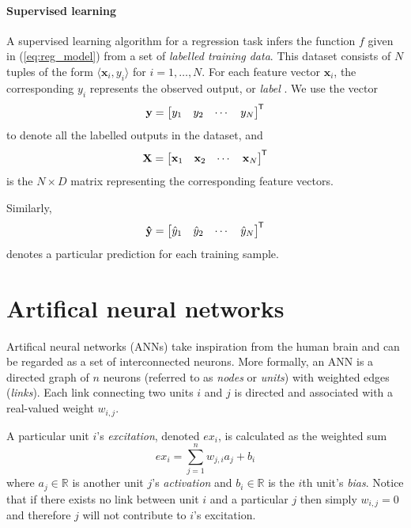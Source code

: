 \documentclass{report}
\renewcommand\vec{\mathbf}
\newcommand*{\tran}{^{\mkern-1.5mu\mathsf{T}}}
\begin{document}
\paragraph{Supervised learning}
A supervised learning algorithm for a regression task infers the function $f$ given in (\ref{eq:reg_model}) from a set of \textit{labelled training data}. This dataset consists of $N$ tuples of the form $\langle \vec{x}_i, y_i\rangle$ for $i=1,\dots,N$.
For each feature vector $\vec{x}_i$, the corresponding $y_i$ represents the observed output, or \textit{label} \cite{burkov2019}.
We use the vector
\begin{equation}
    \vec{y} = \begin{bmatrix}
        y_1 & y_2 & \cdots & y_N
    \end{bmatrix}\tran
\end{equation}
to denote all the labelled outputs in the dataset, and
\begin{equation}
    \vec{X} = \begin{bmatrix}
        \vec{x}_1 & \vec{x}_2 & \cdots & \vec{x}_N
    \end{bmatrix}\tran
\end{equation}
is the $N \times D$ matrix representing the corresponding feature vectors.

Similarly,
\begin{equation}
    \label{eq:sup_learn_prediction}
    \vec{\hat{y}} = \begin{bmatrix}
        \hat{y}_1 & \hat{y}_2 & \cdots & \hat{y}_N
    \end{bmatrix}\tran
\end{equation}
denotes a particular prediction for each training sample.

\section{Artifical neural networks}
Artifical neural networks (ANNs) take inspiration from the human brain and can be regarded as a set of interconnected neurons. 
More formally, an ANN is a directed graph of $n$ neurons (referred to as \textit{nodes} or \textit{units}) with weighted edges (\textit{links}).
Each link connecting two units $i$ and $j$ is directed and associated with a real-valued weight $w_{i,j}$. 

A particular unit $i$'s \textit{excitation}, denoted ${ex}_i$, is calculated as the weighted sum
\begin{equation}
    {ex}_i = \sum_{j=1}^n{w_{j,i} a_j} + b_i
\end{equation}
where $a_j \in \mathbb{R}$ is another unit $j$'s \textit{activation} and $b_i \in \mathbb{R}$ is the $i$th unit's \textit{bias}.
Notice that if there exists no link between unit $i$ and a particular $j$ then simply $w_{i,j}=0$ and therefore $j$ will not contribute to $i$'s excitation. 
\end{document}
